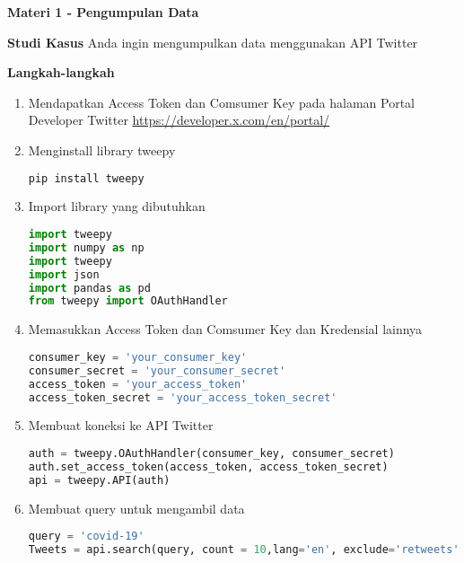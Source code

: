 \documentclass{article}
\begin{document}
    \begin{flushleft}
        \textbf{Materi 1 - Pengumpulan Data}
        \newline
        
        \textbf{Studi Kasus}
        \newline
        Anda ingin mengumpulkan data menggunakan API Twitter
        \newline

        \textbf{Langkah-langkah}

        \begin{enumerate}
            \item Mendapatkan Access Token dan Comsumer Key pada halaman Portal Developer Twitter \href{https://developer.x.com/en/portal/}{https://developer.x.com/en/portal/}
            \item Menginstall library tweepy
            \lstset{style=bashstyle}
            \begin{lstlisting}[language=bash]
pip install tweepy
            \end{lstlisting}

            \item Import library yang dibutuhkan
            \lstset{style=pythonstyle}
            \begin{lstlisting}[language=python]
import tweepy
import numpy as np
import tweepy
import json
import pandas as pd
from tweepy import OAuthHandler
            \end{lstlisting}

            \item Memasukkan Access Token dan Comsumer Key dan Kredensial lainnya
            \lstset{style=pythonstyle}
            \begin{lstlisting}[language=python]
consumer_key = 'your_consumer_key'
consumer_secret = 'your_consumer_secret'
access_token = 'your_access_token'
access_token_secret = 'your_access_token_secret'
            \end{lstlisting}

            \item Membuat koneksi ke API Twitter
            \lstset{style=pythonstyle}
            \begin{lstlisting}[language=python]
auth = tweepy.OAuthHandler(consumer_key, consumer_secret)
auth.set_access_token(access_token, access_token_secret)
api = tweepy.API(auth)
            \end{lstlisting}

            \item Membuat query untuk mengambil data
            \lstset{style=pythonstyle}
            \begin{lstlisting}[language=python]
query = 'covid-19'
Tweets = api.search(query, count = 10,lang='en', exclude='retweets',tweet_mode='extended')
            \end{lstlisting}
        \end{enumerate}
    \end{flushleft}
\end{document}
